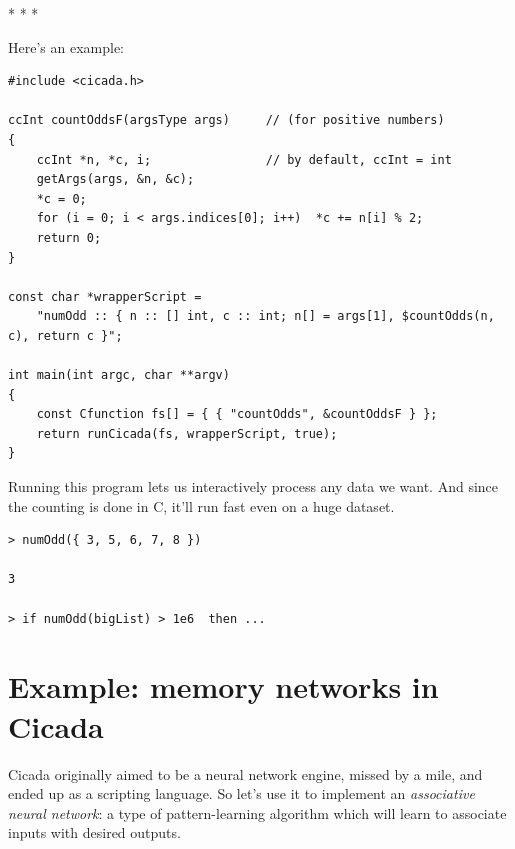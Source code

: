 \documentclass{article}
\newenvironment{code}{
       \begin{list}{}{
               \setlength{\leftmargin}{.4in}
               \setlength{\rightmargin}{0in}
               \setlength{\topsep}{.2in}
       }
       \small
       \item[] }
       { \end{list}   }
\begin{document}
\vspace{.25in}
\begin{centering}
* * *\\
\end{centering}

\vspace{.3in} \noindent Here's an example:

\begin{code} \begin{verbatim}
#include <cicada.h>

ccInt countOddsF(argsType args)     // (for positive numbers)
{
    ccInt *n, *c, i;                // by default, ccInt = int
    getArgs(args, &n, &c);
    *c = 0;
    for (i = 0; i < args.indices[0]; i++)  *c += n[i] % 2;
    return 0;
}

const char *wrapperScript =
    "numOdd :: { n :: [] int, c :: int; n[] = args[1], $countOdds(n, c), return c }";

int main(int argc, char **argv)
{
    const Cfunction fs[] = { { "countOdds", &countOddsF } };
    return runCicada(fs, wrapperScript, true);
}
\end{verbatim} \end{code}
 
\noindent Running this program lets us interactively process any data we want.  And since the counting is done in C, it'll run fast even on a huge dataset.

\begin{code} \begin{verbatim}
> numOdd({ 3, 5, 6, 7, 8 })

3

> if numOdd(bigList) > 1e6  then ...
\end{verbatim} \end{code}

\newpage








\section{Example:  memory networks in Cicada}

Cicada originally aimed to be a neural network engine, missed by a mile, and ended up as a scripting language.  So let's use it to implement an \emph{associative neural network}:  a type of pattern-learning algorithm which will learn to associate inputs with desired outputs.\\
\end{document}
